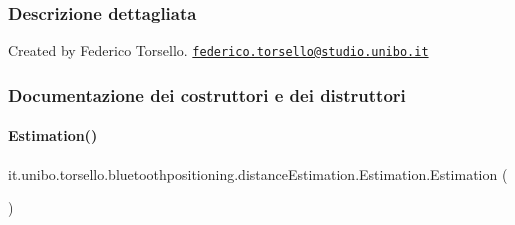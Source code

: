 \subsubsection{Descrizione dettagliata}
Created by Federico Torsello. \href{mailto:federico.torsello@studio.unibo.it}{\tt federico.\+torsello@studio.\+unibo.\+it} 

\subsubsection{Documentazione dei costruttori e dei distruttori}
\hypertarget{classit_1_1unibo_1_1torsello_1_1bluetoothpositioning_1_1distanceEstimation_1_1Estimation_abd84ded1e26d40304606ce0572735106_abd84ded1e26d40304606ce0572735106}{}\label{classit_1_1unibo_1_1torsello_1_1bluetoothpositioning_1_1distanceEstimation_1_1Estimation_abd84ded1e26d40304606ce0572735106_abd84ded1e26d40304606ce0572735106} 
\paragraph{\texorpdfstring{Estimation()}{Estimation()}}
{\footnotesize\ttfamily it.\+unibo.\+torsello.\+bluetoothpositioning.\+distance\+Estimation.\+Estimation.\+Estimation (\begin{DoxyParamCaption}{ }\end{DoxyParamCaption})}


